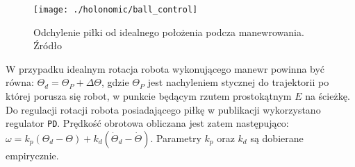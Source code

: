 \begin{figure}[h]
\centering
\texttt{[image: ./holonomic/ball\_control]}
\caption{ Odchylenie piłki od idealnego położenia podcza manewrowania. Źródło \cite{dribbling} }\label{fig:ball_control}
\end{figure}
W przypadku idealnym rotacja robota wykonującego manewr powinna być równa: $\Theta_{d}=\Theta_{P} + \Delta\Theta$, gdzie $\Theta_{P}$ jest nachyleniem stycznej do trajektorii po której porusza się robot, w punkcie
będącym rzutem prostokątnym $E$ na ścieżkę.  Do regulacji rotacji robota posiadającego piłkę w publikacji \cite{dribbling}
wykorzystano regulator \texttt{PD}. Prędkość obrotowa obliczana jest zatem następująco: $\omega=k_p(\Theta_d -\Theta) +k_d(\dot{\Theta}_d -\dot{\Theta} )$. Parametry $k_p$ oraz $k_d$ są dobierane empirycznie.

